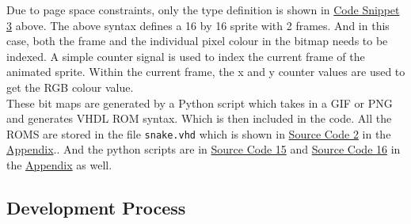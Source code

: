 \documentclass[aps, secnumarabic, balancelastpage, asmath, amssymb, nofootinbib, floatfix,]{revtex4-2}
\begin{document}
{Due to page space constraints, only the type definition is shown in \hyperref[code:3]{Code Snippet 3} above. The above syntax defines a 16 by 16 sprite with 2 frames. And in this case, both the frame and the individual pixel colour in the bitmap needs to be indexed. A simple counter signal is used to index the current frame of the animated sprite. Within the current frame, the x and y counter values are used to get the RGB colour value.\\
These bit maps are generated by a Python script which takes in a GIF or PNG and generates VHDL ROM syntax. Which is then included in the code. All the ROMS are stored in the file \verb|snake.vhd| which is shown in \hyperref[code:snake]{Source Code 2} in the \hyperref[sec:app]{Appendix}.. And the python scripts are in \hyperref[code:py]{Source Code 15} and \hyperref[code:py2]{Source Code 16} in the \hyperref[sec:app]{Appendix} as well.

\vspace{-0.7em}
\subsection{\fontsize{11.4pt}{12pt}\selectfont \bf Development Process \label{sec:2.3}}

}
\end{document}
